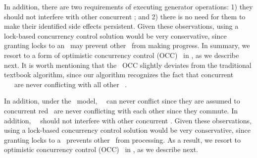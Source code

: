 In addition, there are two requirements of executing generator operations: 1) they should
not interfere with other concurrent \transactions; and 2) there is no
need for them to make their identified side effects persistent. 
Given these observations, using a lock-based
concurrency control solution would be very conservative, since
granting locks to an \transaction\ may prevent other \transactions\ from making progress.
In summary, we resort to a form of optimistic concurrency control
(OCC)~\cite{Bernstein1987CCR} in \gemini, as we describe next. 
It is worth mentioning that the \gemini\ OCC slightly
deviates from the traditional textbook algorithm, since
our algorithm recognizes the fact that concurrent
\blue\ \shadow\ \operations\ are never conflicting with
all other \shadow\ \operations.

In addition, under the \RBc\ model, \blue\ \transactions\ can never
conflict since they are assumed to concurrent red \transactions\ are
never conflicting with each other since they commute. In addition,
\initial\ \transactions\ should not interfere with other concurrent
\transactions.  Given these observations, using a lock-based
concurrency control solution would be very conservative, since
granting locks to a \transaction\ prevents other \transactions\ from
processing. As a result, we resort to optimistic concurrency control
(OCC)~\cite{Bernstein1987CCR} in \gemini, as we describe next.

